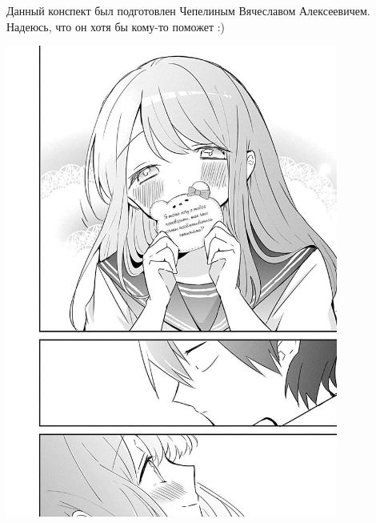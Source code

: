 Данный конспект был подготовлен Чепелиным Вячеславом Алексеевичем. Надеюсь, что он хотя бы кому-то поможет :)


\begin{center}
\includegraphics[width=0.82\textwidth]{MyLove.jpg}    
\end{center}



